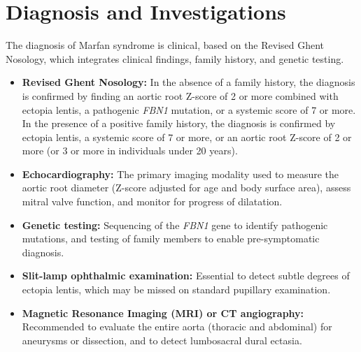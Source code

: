 \section*{Diagnosis and Investigations}
The diagnosis of Marfan syndrome is clinical, based on the Revised Ghent Nosology, which integrates clinical findings, family history, and genetic testing.
\begin{itemize}
    \item \textbf{Revised Ghent Nosology:} In the absence of a family history, the diagnosis is confirmed by finding an aortic root Z-score of 2 or more combined with ectopia lentis, a pathogenic \textit{FBN1} mutation, or a systemic score of 7 or more. In the presence of a positive family history, the diagnosis is confirmed by ectopia lentis, a systemic score of 7 or more, or an aortic root Z-score of 2 or more (or 3 or more in individuals under 20 years).
    \item \textbf{Echocardiography:} The primary imaging modality used to measure the aortic root diameter (Z-score adjusted for age and body surface area), assess mitral valve function, and monitor for progress of dilatation.
    \item \textbf{Genetic testing:} Sequencing of the \textit{FBN1} gene to identify pathogenic mutations, and testing of family members to enable pre-symptomatic diagnosis.
    \item \textbf{Slit-lamp ophthalmic examination:} Essential to detect subtle degrees of ectopia lentis, which may be missed on standard pupillary examination.
    \item \textbf{Magnetic Resonance Imaging (MRI) or CT angiography:} Recommended to evaluate the entire aorta (thoracic and abdominal) for aneurysms or dissection, and to detect lumbosacral dural ectasia.
\end{itemize}

